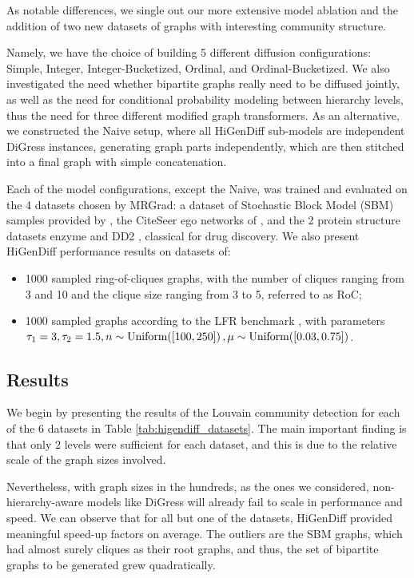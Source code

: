 As notable differences, we single out our more extensive model ablation and the addition of two new datasets of graphs with interesting community structure.

Namely, we have the choice of building 5 different diffusion configurations: Simple, Integer, Integer-Bucketized, Ordinal, and Ordinal-Bucketized. We also investigated the need whether bipartite graphs really need to be diffused jointly, as well as the need for conditional probability modeling between hierarchy levels, thus the need for three different modified graph transformers. As an alternative, we constructed the Naive setup, where all HiGenDiff sub-models are independent DiGress instances, generating graph parts independently, which are then stitched into a final graph with simple concatenation.

Each of the model configurations, except the Naive, was trained and evaluated on the 4 datasets chosen by MRGrad: a dataset of Stochastic Block Model (SBM) samples provided by \cite{martinkus_spectre_2022}, the CiteSeer ego networks of \cite{sen_collective_2008}, and the 2 protein structure datasets enzyme \cite{schomburg_brenda_2004} and DD2 \cite{dobson_distinguishing_2003}, classical for drug discovery. We also present HiGenDiff performance results on datasets of:
\begin{itemize}
    \item 1000 sampled ring-of-cliques graphs, with the number of cliques ranging from 3 and 10 and the clique size ranging from 3 to 5, referred to as RoC;
    \item 1000 sampled graphs according to the LFR benchmark \cite{lancichinetti_finding_2011}, with parameters $\tau_1=3, \tau_2=1.5, n \sim \text{Uniform}\mathopen{}\left(\mathopen{}\left[100, 250\right]\right), \mu \sim \text{Uniform}\mathopen{}\left(\mathopen{}\left[0.03, 0.75\right]\right)$.
\end{itemize}

\subsection{Results}

We begin by presenting the results of the Louvain community detection for each of the 6 datasets in Table \ref{tab:higendiff_datasets}. The main important finding is that only 2 levels were sufficient for each dataset, and this is due to the relative scale of the graph sizes involved. 

Nevertheless, with graph sizes in the hundreds, as the ones we considered, non-hierarchy-aware models like DiGress will already fail to scale in performance and speed. We can observe that for all but one of the datasets, HiGenDiff provided meaningful speed-up factors on average. The outliers are the SBM graphs, which had almost surely cliques as their root graphs, and thus, the set of bipartite graphs to be generated grew quadratically.

